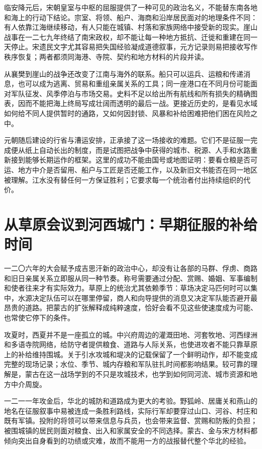 临安降元后，宋朝皇室与中枢的屈服提供了一种可见的政治名义，不能替东南各地和海上的行动下结论。宗室、将领、船户、海商和沿岸居民面对的地理条件不同：有人依靠江海继续移动，有人只能在城镇、村落和家族网络中接受新的现实。崖山战事在一二七九年终结了南宋政权，却不能让每一种地方抵抗、迁徙和重建在同一天停止。宋遗民文字尤其容易把失国经验凝成道德叙事，元方记录则易把接收写作秩序恢复；两者都须同海港、寺院、契约和地方材料的片段并读。

从襄樊到崖山的战争还改变了江南与海外的联系。船只可以运兵、运粮和传递消息，也可以成为逃离、贸易和重组亲属关系的工具；同一座港口在不同月份可能面对军队征发、风季停泊与市场交易。史料不足以给出所有航线和所有损失的精确图表，因而不能把海上终局写成壮阔而透明的最后一战。更接近历史的，是看见水域如何给不同人提供暂时的通路，又如何因封锁、风暴和补给困难把他们困在风险之中。

元朝随后建设的行省与漕运安排，正承接了这一场接收的难题。它们不是征服一完成便从纸上自动长出的制度，而是试图把战争中获得的城市、税源、人手和水路重新接到能够长期运作的框架。这里的成功不能由国号或地图证明：要看仓粮是否可运、地方中介是否留用、船户与工匠是否还能工作，以及新旧文书能否在同一地区被理解。江水没有替任何一方保证胜利；它要求每一个统治者付出持续组织的代价。

\section{从草原会议到河西城门：早期征服的补给时间}

一二〇六年的大会赋予成吉思汗新的政治中心，却没有让各部的马群、俘虏、商路和旧日亲属关系立即服从同一种节奏。称号需要通过分配、赏赐、婚姻、军事编制和使者往来才有实际效力。草原上的统治尤其依赖季节：草场决定马匹何时可以集中，水源决定队伍可以在哪里停留，商人和向导提供的消息又决定军队能否避开最昂贵的道路。把蒙古的扩张解释成纯粹速度，恰好会看不见这些使速度成为可能、也常使它停下的条件。

攻夏时，西夏并不是一座孤立的城。中兴府周边的灌溉田地、河套牧地、河西绿洲和多语寺院网络，给防守者提供粮食、道路与人际关系，也使进攻者不能只靠草原上的补给维持围城。关于引水攻城和堤决的记载保留了一个鲜明动作，却不能变成完整的现场记录；水位、季节、城内存粮和军队驻扎时间都影响结果。较可靠的理解是，蒙古在这一战场学到的不只是攻城技术，也学到如何同河流、城市资源和地方中介周旋。

一二一一年攻金后，华北的城防和道路成为更大的考验。野狐岭、居庸关和燕山的地名在征服叙事中易被连成一条胜利路线，实际行军却要穿过山口、河谷、村庄和既有军镇。投附的将领可以带来信息与兵员，也会带来监督、赏赐和防叛的负担；被围城镇的居民则面对粮食、出入和家属安全的不同选择。蒙古、金与宋方材料都倾向突出自身看到的功绩或灾难，故而不能用一方的战报替代整个华北的经验。

